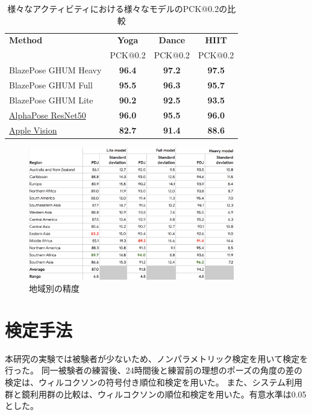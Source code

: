   \begin{table}[ht]
    \centering
    \begin{tabular}{|l|c|c|c|}
    \hline
    \textbf{Method} & \textbf{Yoga} & \textbf{Dance} & \textbf{HIIT} \\
                    & PCK@0.2       & PCK@0.2        & PCK@0.2       \\ 
    \hline
    BlazePose GHUM Heavy                                                      & \textbf{96.4} & \textbf{97.2} & \textbf{97.5} \\
    BlazePose GHUM Full                                                       & \textbf{95.5} & \textbf{96.3} & \textbf{95.7} \\
    BlazePose GHUM Lite                                                       & \textbf{90.2} & \textbf{92.5} & \textbf{93.5} \\
    \href{https://github.com/MVIG-SJTU/AlphaPose}{AlphaPose ResNet50}         & \textbf{96.0} & \textbf{95.5} & \textbf{96.0} \\
    \href{https://developer.apple.com/documentation/vision/detecting_human_body_poses_in_images}{Apple Vision} & \textbf{82.7} & \textbf{91.4} & \textbf{88.6} \\
    \hline
    \end{tabular}
    \caption{様々なアクティビティにおける様々なモデルのPCK@0.2の比較 \cite{pose-estimation-quality}}
    \label{tab:pose-estimation-quality}
  \end{table}
    
  \begin{figure}[H]
    \begin{center}
    \includegraphics[width=9cm]{figures/Model_Accuracy_by_Race.png}
    \caption{地域別の精度 \cite{Model-Accuracy-by-Race}}
    \label{fig:Model-Accuracy-by-Race}
    \end{center}
  \end{figure}

\section{検定手法}
  本研究の実験では被験者が少ないため、ノンパラメトリック検定を用いて検定を行った。
  同一被験者の練習後、24時間後と練習前の理想のポーズの角度の差の検定は、ウィルコクソンの符号付き順位和検定を用いた。
  また、システム利用群と鏡利用群の比較は、ウィルコクソンの順位和検定を用いた。有意水準は0.05とした。
